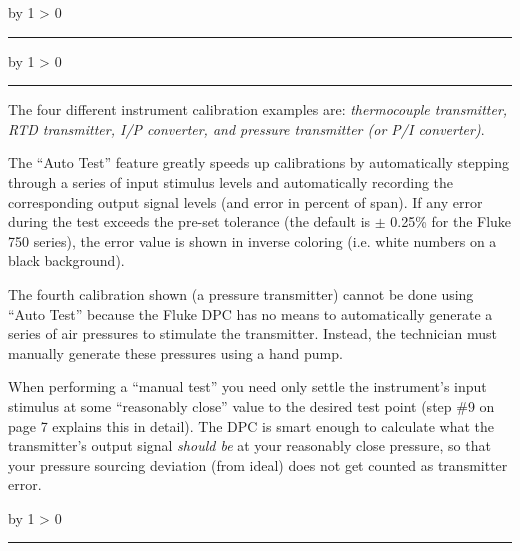 \documentclass[12pt,a4paper]{article}
\def\oppgave{
            \advance\questnum by 1
            \ifnum \questnum > 0
                 \hrule
                 \vskip 3pt
                 \leftline{Oppgave \the\questnum}
                 \vskip 3pt \fi}
\def\svar{
           \advance\answnum by 1
           \ifnum \answnum > 0
                \hrule
                \vskip 3pt
                \leftline{Svar \the\answnum}
                \vskip 3pt \fi}
\def\notes{
           \advance\explnum by 1
           \ifnum \explnum > 0
                \hrule
                \vskip 3pt
                \leftline{Notes \the\explnum}
                \vskip 3pt \fi}
\begin{document}
\vskip 10pt \filbreak 





\svar{} 


\vskip 10pt \filbreak 





\notes{} 

The four different instrument calibration examples are: {\it thermocouple transmitter, RTD transmitter, I/P converter, and pressure transmitter (or P/I converter)}.

\vskip 10pt

The ``Auto Test'' feature greatly speeds up calibrations by automatically stepping through a series of input stimulus levels and automatically recording the corresponding output signal levels (and error in percent of span).  If any error during the test exceeds the pre-set tolerance (the default is $\pm$ 0.25\% for the Fluke 750 series), the error value is shown in inverse coloring (i.e. white numbers on a black background).

\vskip 10pt

The fourth calibration shown (a pressure transmitter) cannot be done using ``Auto Test'' because the Fluke DPC has no means to automatically generate a series of air pressures to stimulate the transmitter.  Instead, the technician must manually generate these pressures using a hand pump.

\vskip 10pt

When performing a ``manual test'' you need only settle the instrument's input stimulus at some ``reasonably close'' value to the desired test point (step \#9 on page 7 explains this in detail).  The DPC is smart enough to calculate what the transmitter's output signal {\it should be} at your reasonably close pressure, so that your pressure sourcing deviation (from ideal) does not get counted as transmitter error.








\vfil \eject 



\oppgave{} 
\end{document}
